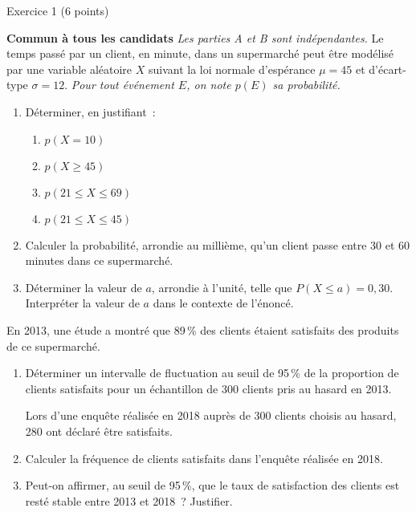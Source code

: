 
\begin{h2}Exercice 1 (6 points)\end{h2}
\textbf{Commun à  tous les candidats}
\medbreak
\emph{Les parties \emph{A} et \emph{B} sont indépendantes.}
Le temps passé par un client, en minute, dans un supermarché peut être modélisé par une variable aléatoire $X$ suivant la loi normale d'espérance $\mu=45$ et d'écart-type $\sigma=12$.
\smallbreak
\emph{Pour tout événement $E$, on note $p(E)$ sa probabilité.}
\begin{enumerate}
     \item Déterminer, en justifiant~:
     \begin{enumerate}[label=\alph*.]
          \item $p(X=10)$
          \item $p(X\geqslant 45)$
          \item $p(21 \leqslant X \leqslant 69)$
          \item $p(21 \leqslant X \leqslant 45)$
     \end{enumerate}
     \item Calculer la probabilité, arrondie au millième, qu'un client passe entre 30 et 60 minutes dans ce supermarché.
     \item Déterminer la valeur de $a$, arrondie à l'unité, telle que $P(X\leqslant a)=0,30$. Interpréter la valeur de $a$ dans le contexte de l'énoncé.
\end{enumerate}
En 2013, une étude a montré que 89\,\% des clients étaient satisfaits des produits de ce supermarché.
\begin{enumerate}
     \item Déterminer un intervalle de fluctuation au seuil de 95\,\% de la proportion de clients satisfaits pour un échantillon de 300 clients pris au hasard en 2013.
\begin{margeneg}
Lors d'une enquête réalisée en 2018 auprès de 300 clients choisis au hasard, 280 ont déclaré être satisfaits.
\end{margeneg}
     \item Calculer la fréquence de clients satisfaits dans l'enquête réalisée en 2018.
     \item Peut-on affirmer, au seuil de 95\,\%, que le taux de satisfaction des clients est resté stable entre 2013 et 2018~? Justifier.
\end{enumerate}

